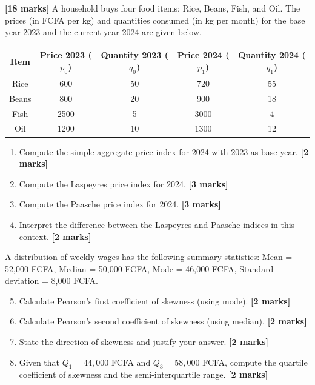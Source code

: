 \documentclass[11pt]{article}
\begin{document}
\begin{exercice} \textbf{[18 marks]}
A household buys four food items: Rice, Beans, Fish, and Oil. The prices (in FCFA per kg) and quantities consumed (in kg per month) for the base year 2023 and the current year 2024 are given below.

\begin{center}
\begin{tabular}{|c|c|c|c|c|}\hline
Item & Price 2023 ($p_0$) & Quantity 2023 ($q_0$) & Price 2024 ($p_1$) & Quantity 2024 ($q_1$) \\ \hline
Rice & 600 & 50 & 720 & 55 \\
Beans & 800 & 20 & 900 & 18 \\
Fish & 2500 & 5 & 3000 & 4 \\
Oil & 1200 & 10 & 1300 & 12 \\ \hline
\end{tabular}
\end{center}

\begin{enumerate}
\item Compute the simple aggregate price index for 2024 with 2023 as base year. \textbf{[2 marks]}
\item Compute the Laspeyres price index for 2024. \textbf{[3 marks]}
\item Compute the Paasche price index for 2024. \textbf{[3 marks]}
\item Interpret the difference between the Laspeyres and Paasche indices in this context. \textbf{[2 marks]}
\end{enumerate}

A distribution of weekly wages has the following summary statistics:
Mean = 52,000 FCFA, Median = 50,000 FCFA, Mode = 46,000 FCFA, Standard deviation = 8,000 FCFA.

\begin{enumerate}
\setcounter{enumi}{4}
\item Calculate Pearson's first coefficient of skewness (using mode). \textbf{[2 marks]}
\item Calculate Pearson's second coefficient of skewness (using median). \textbf{[2 marks]}
\item State the direction of skewness and justify your answer. \textbf{[2 marks]}
\item Given that $Q_1 = 44,000$ FCFA and $Q_3 = 58,000$ FCFA, compute the quartile coefficient of skewness and the semi-interquartile range. \textbf{[2 marks]}
\end{enumerate}
\end{exercice}
\end{document}
